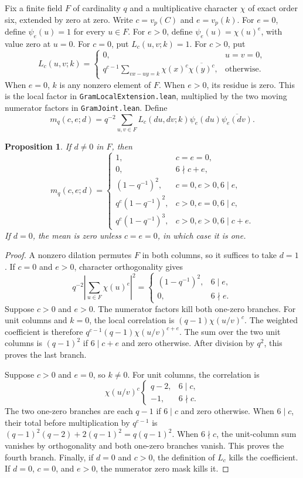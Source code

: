 \documentclass{article}
\newtheorem{proposition}{Proposition}
\begin{document}
Fix a finite field $F$ of cardinality $q$ and a multiplicative character
$\chi$ of exact order six, extended by zero at zero.
Write $c=v_p(C)$ and $e=v_p(k)$.
For $e=0$, define $\psi_e(u)=1$ for every $u\in F$.
For $e>0$, define $\psi_e(u)=\chi(u)^e$, with value zero at $u=0$.
For $c=0$, put $L_c(u,v;k)=1$.
For $c>0$, put
\[
 L_c(u,v;k)=
 \begin{cases}
 0,&u=v=0,\\
 q^{c-1}\displaystyle\sum_{vx-uy=k}
        \chi(x)^c\overline{\chi(y)^c},&\text{otherwise}.
 \end{cases}
\]
When $e=0$, $k$ is any nonzero element of $F$.
When $e>0$, its residue is zero.
This is the local factor in \texttt{GramLocalExtension.lean}, multiplied by
the two moving numerator factors in \texttt{GramJoint.lean}.
Define
\[
 m_q(c,e;d)=q^{-2}\sum_{u,v\in F}
       L_c(du,dv;k)\psi_e(du)\overline{\psi_e(dv)}.
\]

\begin{proposition}
If $d\ne0$ in $F$, then
\[
 m_q(c,e;d)=
 \begin{cases}
 1,&c=e=0,\\
 0,&6\nmid c+e,\\
 (1-q^{-1})^2,&c=0, e>0, 6\mid e,\\
 q^c(1-q^{-1})^2,&c>0, e=0, 6\mid c,\\
 q^c(1-q^{-1})^3,&c>0, e>0, 6\mid c+e.
 \end{cases}
\]
If $d=0$, the mean is zero unless $c=e=0$, in which case it is one.
\end{proposition}

\begin{proof}
A nonzero dilation permutes $F$ in both columns, so it suffices to take $d=1$.
If $c=0$ and $e>0$, character orthogonality gives
\[
 q^{-2}\left|\sum_{u\in F}\chi(u)^e\right|^2
 =\begin{cases}(1-q^{-1})^2,&6\mid e,\\0,&6\nmid e.\end{cases}
\]
Suppose $c>0$ and $e>0$.
The numerator factors kill both one-zero branches.
For unit columns and $k=0$, the local correlation is
$(q-1)\chi(u/v)^c$.
The weighted coefficient is therefore
$q^{c-1}(q-1)\chi(u/v)^{c+e}$.
The sum over the two unit columns is $(q-1)^2$ if $6\mid c+e$ and zero
otherwise.
After division by $q^2$, this proves the last branch.

Suppose $c>0$ and $e=0$, so $k\ne0$.
For unit columns, the correlation is
\[
 \chi(u/v)^c
 \begin{cases}q-2,&6\mid c,\\-1,&6\nmid c.\end{cases}
\]
The two one-zero branches are each $q-1$ if $6\mid c$ and zero otherwise.
When $6\mid c$, their total before multiplication by $q^{c-1}$ is
$(q-1)^2(q-2)+2(q-1)^2=q(q-1)^2$.
When $6\nmid c$, the unit-column sum vanishes by orthogonality and both
one-zero branches vanish.
This proves the fourth branch.
Finally, if $d=0$ and $c>0$, the definition of $L_c$ kills the coefficient.
If $d=0$, $c=0$, and $e>0$, the numerator zero mask kills it.
\end{proof}
\end{document}
